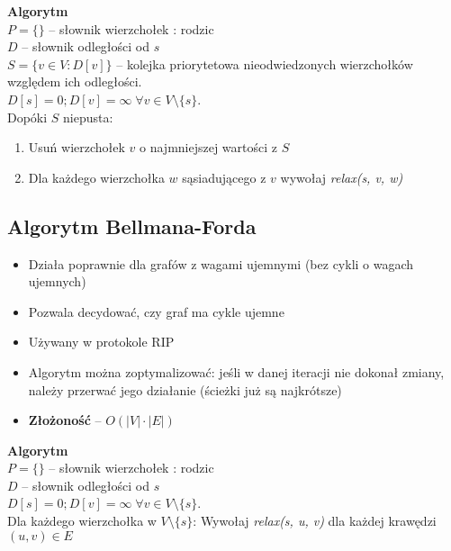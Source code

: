 \documentclass[main.tex]{subfiles}
\begin{document}
    \noindent \textbf{Algorytm}\\

    \noindent $P = \{\}$ -- słownik wierzchołek : rodzic\\
    $D$ -- słownik odległości od $s$\\
    $S = \{v \in V : D[v]\}$ -- kolejka priorytetowa nieodwiedzonych wierzchołków względem ich odległości.\\
    $D[s] = 0; D[v] = \infty \; \forall v \in V \setminus \{s\}$.\\

    \noindent Dopóki $S$ niepusta:
    \begin{enumerate}[noitemsep]
        \item Usuń wierzchołek $v$ o najmniejszej wartości z $S$
        \item Dla każdego wierzchołka $w$ sąsiadującego z $v$ wywołaj \textit{relax(s, v, w)}
    \end{enumerate}

    \subsection{Algorytm Bellmana-Forda}

    \begin{itemize}[noitemsep]
        \item Działa poprawnie dla grafów z wagami ujemnymi (bez cykli o wagach ujemnych)
        \item Pozwala decydować, czy graf ma cykle ujemne
        \item Używany w protokole RIP
        \item Algorytm można zoptymalizować: jeśli w danej iteracji nie dokonał zmiany,
        należy przerwać jego działanie (ścieżki już są najkrótsze)
        \item \textbf{Złożoność} -- $O(|V| \cdot |E|)$
    \end{itemize}

    \noindent \textbf{Algorytm}\\

    \noindent $P = \{\}$ -- słownik wierzchołek : rodzic\\
    $D$ -- słownik odległości od $s$\\
    $D[s] = 0; D[v] = \infty \; \forall v \in V \setminus \{s\}$.\\

    Dla każdego wierzchołka w $V \setminus \{s\}$:
    \vskip 0pt Wywołaj \textit{relax(s, u, v)} dla każdej krawędzi $(u, v) \in E$
    \[\]
\end{document}
